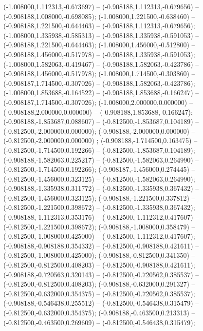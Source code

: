  (-1.008000,1.112313,-0.673697) -- (-0.908188,1.112313,-0.679656) -- (-0.908188,1.008000,-0.698085);
 (-1.008000,1.221500,-0.638460) -- (-0.908188,1.221500,-0.644463) -- (-0.908188,1.112313,-0.679656);
 (-1.008000,1.335938,-0.585313) -- (-0.908188,1.335938,-0.591053) -- (-0.908188,1.221500,-0.644463);
 (-1.008000,1.456000,-0.512800) -- (-0.908188,1.456000,-0.517978) -- (-0.908188,1.335938,-0.591053);
 (-1.008000,1.582063,-0.419467) -- (-0.908188,1.582063,-0.423786) -- (-0.908188,1.456000,-0.517978);
 (-1.008000,1.714500,-0.303860) -- (-0.908187,1.714500,-0.307026) -- (-0.908188,1.582063,-0.423786);
 (-1.008000,1.853688,-0.164522) -- (-0.908188,1.853688,-0.166247) -- (-0.908187,1.714500,-0.307026);
 (-1.008000,2.000000,0.000000) -- (-0.908188,2.000000,0.000000) -- (-0.908188,1.853688,-0.166247);
 (-0.908188,-1.853687,0.088607) -- (-0.812500,-1.853687,0.104189) -- (-0.812500,-2.000000,0.000000);
 (-0.908188,-2.000000,0.000000) -- (-0.812500,-2.000000,0.000000) ;
 (-0.908188,-1.714500,0.163475) -- (-0.812500,-1.714500,0.192266) -- (-0.812500,-1.853687,0.104189);
 (-0.908188,-1.582063,0.225217) -- (-0.812500,-1.582063,0.264990) -- (-0.812500,-1.714500,0.192266);
 (-0.908187,-1.456000,0.274445) -- (-0.812500,-1.456000,0.323125) -- (-0.812500,-1.582063,0.264990);
 (-0.908188,-1.335938,0.311772) -- (-0.812500,-1.335938,0.367432) -- (-0.812500,-1.456000,0.323125);
 (-0.908188,-1.221500,0.337812) -- (-0.812500,-1.221500,0.398672) -- (-0.812500,-1.335938,0.367432);
 (-0.908188,-1.112313,0.353176) -- (-0.812500,-1.112312,0.417607) -- (-0.812500,-1.221500,0.398672);
 (-0.908188,-1.008000,0.358479) -- (-0.812500,-1.008000,0.425000) -- (-0.812500,-1.112312,0.417607);
 (-0.908188,-0.908188,0.354332) -- (-0.812500,-0.908188,0.421611) -- (-0.812500,-1.008000,0.425000);
 (-0.908188,-0.812500,0.341350) -- (-0.812500,-0.812500,0.408203) -- (-0.812500,-0.908188,0.421611);
 (-0.908188,-0.720563,0.320143) -- (-0.812500,-0.720562,0.385537) -- (-0.812500,-0.812500,0.408203);
 (-0.908188,-0.632000,0.291327) -- (-0.812500,-0.632000,0.354375) -- (-0.812500,-0.720562,0.385537);
 (-0.908188,-0.546438,0.255512) -- (-0.812500,-0.546438,0.315479) -- (-0.812500,-0.632000,0.354375);
 (-0.908188,-0.463500,0.213313) -- (-0.812500,-0.463500,0.269609) -- (-0.812500,-0.546438,0.315479);
